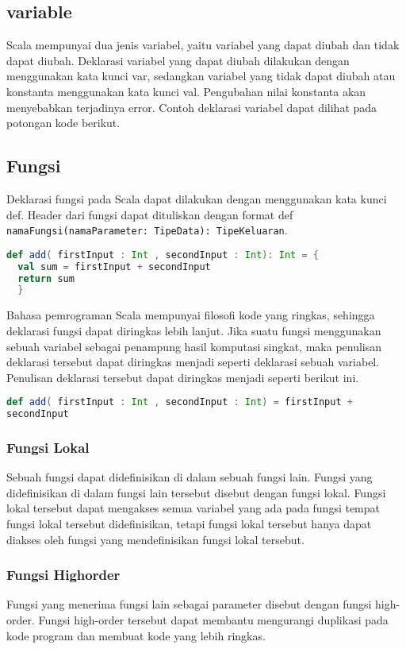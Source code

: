 \subsection{variable}
Scala mempunyai dua jenis variabel, yaitu variabel yang dapat diubah dan tidak dapat diubah.
Deklarasi variabel yang dapat diubah dilakukan dengan menggunakan kata kunci var, sedangkan
variabel yang tidak dapat diubah atau konstanta menggunakan kata kunci val. Pengubahan
nilai konstanta akan menyebabkan terjadinya error. Contoh deklarasi variabel dapat dilihat pada
potongan kode berikut.

\subsection{Fungsi}
Deklarasi fungsi pada Scala dapat dilakukan dengan menggunakan kata kunci def. Header dari fungsi
dapat dituliskan dengan format def \texttt{namaFungsi(namaParameter: TipeData): TipeKeluaran}.
\begin{lstlisting}[language=Scala, caption=Deklarasi Fungsi]
def add( firstInput : Int , secondInput : Int): Int = {
  val sum = firstInput + secondInput
  return sum
  }
\end{lstlisting}
Bahasa pemrograman Scala mempunyai filosofi kode yang ringkas, sehingga deklarasi fungsi
dapat diringkas lebih lanjut. Jika suatu fungsi menggunakan sebuah variabel sebagai penampung
hasil komputasi singkat, maka penulisan deklarasi tersebut dapat diringkas menjadi seperti deklarasi
sebuah variabel. Penulisan deklarasi tersebut dapat diringkas menjadi seperti berikut ini.

\begin{lstlisting}[language=Scala, caption=Deklarasi Fungsi Ringkas]
def add( firstInput : Int , secondInput : Int) = firstInput +
secondInput
\end{lstlisting}


\subsubsection{Fungsi Lokal}
Sebuah fungsi dapat didefinisikan di dalam sebuah fungsi lain. Fungsi yang didefinisikan di dalam
fungsi lain tersebut disebut dengan fungsi lokal. Fungsi lokal tersebut dapat mengakses semua
variabel yang ada pada fungsi tempat fungsi lokal tersebut didefinisikan, tetapi fungsi lokal tersebut hanya dapat diakses oleh fungsi yang mendefinisikan fungsi lokal tersebut.

\subsubsection{Fungsi Highorder}
Fungsi yang menerima fungsi lain sebagai parameter disebut dengan fungsi high-order. Fungsi
high-order tersebut dapat membantu mengurangi duplikasi pada kode program dan membuat kode
yang lebih ringkas.

